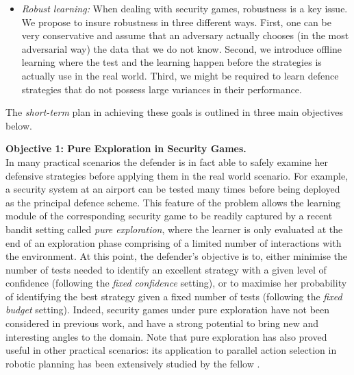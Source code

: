 \begin{itemize}
\item \textit{Robust learning:} When dealing with security games, robustness is a key issue. We propose to insure robustness in  three different ways. First, one can be  very conservative and assume that an adversary actually chooses (in the most adversarial way) the data that we do not know. Second, we introduce offline learning  where the test and the learning happen  before the strategies is actually use in the real world. Third, we might be required to learn defence strategies that do not possess large variances in their performance. 
\end{itemize}
The \textit{short-term} plan in achieving these goals is outlined in three main objectives below.

\textbf{Objective 1: Pure Exploration in Security Games.}\\
In many practical scenarios the defender is in fact able to safely examine her defensive strategies before applying them in the real world scenario. For example, a security system at an airport can be tested many times before being deployed as the principal defence scheme. This feature of the problem allows the learning module of the corresponding security game to be readily captured by a recent bandit setting called \textit{pure exploration}, where the learner is only evaluated at the end of an exploration phase comprising of a limited number of interactions with the environment. 
At this point, the defender's objective is to, either minimise the number of tests needed to identify an excellent strategy with a given level of confidence
(following the \textit{fixed confidence} setting\cite{Maron93HR,Even-Dar06AE}), or to maximise her probability of identifying the best strategy given a fixed number of tests (following the \textit{fixed budget} setting\cite{Bubeck09PE,Audibert10BA}).
Indeed, security games under pure exploration have not been considered in previous work, and have a strong potential to bring new and interesting angles to the domain. Note that pure exploration has also proved useful in other practical scenarios: its application to parallel action selection in robotic planning has been extensively studied by the fellow \cite{Gabillon11MB}.
%
%

